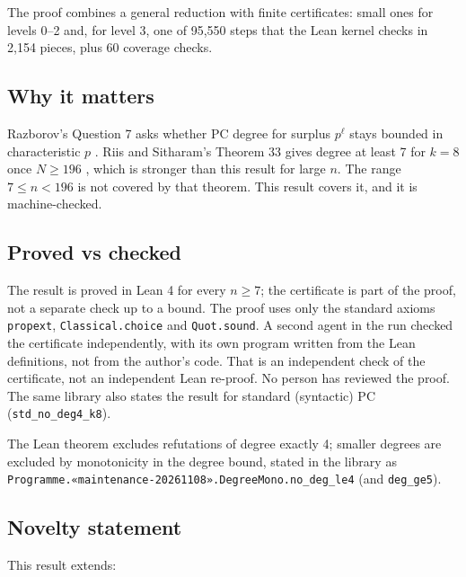 \documentclass{article}
\begin{document}
The proof combines a general reduction with finite certificates: small ones for levels 0--2 and,
for level 3, one of 95,550 steps that the Lean kernel checks in 2,154 pieces, plus 60 coverage checks.

\subsection*{Why it matters}

Razborov's Question 7 asks whether PC degree for surplus $p^\ell$ stays bounded in characteristic
$p$ \cite{razborov2001php}. Riis and Sitharam's Theorem 33 gives degree at least 7 for $k=8$ once
$N\ge196$ \cite{riis1997nonconstant}, which is stronger than this result for large $n$. The range
$7\le n<196$ is not covered by that theorem. This result covers it, and it is machine-checked.

\subsection*{Proved vs checked}

The result is proved in Lean 4 for every $n\ge7$; the certificate is part of the proof, not a
separate check up to a bound. The proof uses only the standard axioms \texttt{propext},
\texttt{Classical.choice} and \texttt{Quot.sound}. A second agent in the run checked the certificate
independently, with its own program written from the Lean definitions, not from the author's
code. That is an independent check of the certificate, not an independent Lean re-proof. No
person has reviewed the proof. The same library also states the result for standard (syntactic)
PC (\texttt{std\_no\_deg4\_k8}).

The Lean theorem excludes refutations of degree exactly 4; smaller degrees are excluded by monotonicity in
the degree bound, stated in the library as \texttt{Programme.«maintenance-20261108».DegreeMono.no\_deg\_le4} (and \texttt{deg\_ge5}).

\subsection*{Novelty statement}

This result extends:
\end{document}
